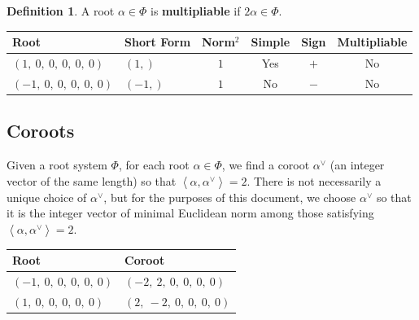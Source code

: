 \documentclass[11pt]{article}
\newcommand{\noi}{\noindent}
\newcommand{\tbf}{\textbf}
\newcommand{\la}{\left\langle}
\newcommand{\ra}{\right\rangle}
\theoremstyle{definition}
\newtheorem{definition}{Definition}[section]
\newif\ifsummablepairs
\begin{document}
\begin{definition}
A root $\alpha \in \Phi$ is \tbf{multipliable} if $2\alpha \in \Phi$.
\end{definition}

\noi \begin{tabular}{|l|l|c|c|c|c|}
    \hline
    \textbf{Root} & \textbf{Short Form} & \textbf{Norm$^2$} & \textbf{Simple} & \textbf{Sign} & \textbf{Multipliable} \\
    \hline
    $\left( 1, \  0, \  0, \  0, \  0, \  0\right)$ & $\left( 1,\right)$ & $1$ & Yes & $+$ & No \\
    \hline
    $\left( -1, \  0, \  0, \  0, \  0, \  0\right)$ & $\left( -1,\right)$ & $1$ & No & $-$ & No \\
    \hline
\end{tabular}


\subsection{Coroots}

Given a root system $\Phi$, for each root $\alpha \in \Phi$, we find a coroot $\alpha^\vee$ (an integer vector of the same length) so that $\la \alpha, \alpha^\vee \ra = 2$. There is not necessarily a unique choice of $\alpha^\vee$, but for the purposes of this document, we choose $\alpha^\vee$ so that it is the integer vector of minimal Euclidean norm among those satisfying $\la \alpha, \alpha^\vee \ra = 2$.

\bigskip

\noindent \begin{tabular}{|l|l|}
    \hline
    \textbf{Root} & \textbf{Coroot} \\
    \hline
    $\left( -1, \  0, \  0, \  0, \  0, \  0\right)$ & $\left( -2, \  2, \  0, \  0, \  0, \  0\right)$ \\
    \hline
    $\left( 1, \  0, \  0, \  0, \  0, \  0\right)$ & $\left( 2, \  -2, \  0, \  0, \  0, \  0\right)$ \\
    \hline
\end{tabular}


\ifsummablepairs
\subsection{Linear combinations of roots}

\begin{definition}
For two roots $\alpha, \beta$ in a root system $\Phi$, the set of positive integral linear combinations of $\alpha, \beta$ that are also roots is denoted
\(
	(\alpha, \beta) = \{ i \alpha + j \beta \in \Phi : i, j \in \mathbb{Z}_{\ge 1} \}
\).
\end{definition}
\noi 
\fi
\end{document}
